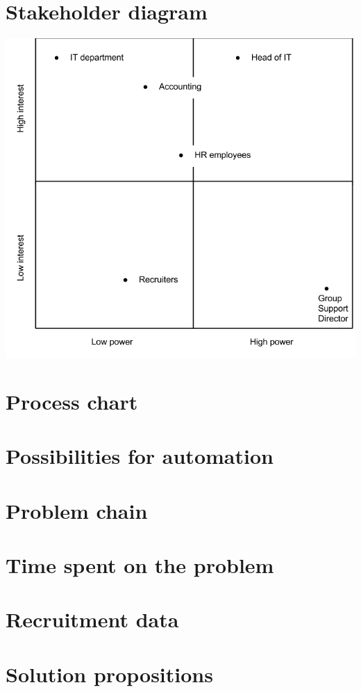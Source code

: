 \chapter{Stakeholder diagram}
\label{app:stakeholder_diagram}
\includegraphics[width=\textwidth]{appendix/stakeholder_diagram.png}
\chapter{Process chart}

\chapter{Possibilities for automation}

\chapter{Problem chain}

\chapter{Time spent on the problem}

\chapter{Recruitment data}

\chapter{Solution propositions}

